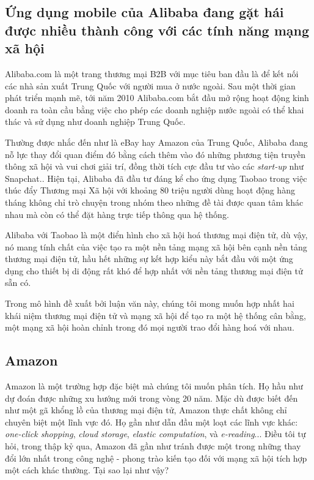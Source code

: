 \subsection{Ứng dụng mobile của Alibaba đang gặt hái được nhiều thành công với các tính năng mạng xã hội}

Alibaba.com là một trang thương mại B2B với mục tiêu ban đầu là để kết nối các nhà sản xuất Trung Quốc với người mua ở nước ngoài. Sau một thời gian phát triển mạnh mẽ, tới năm 2010 Alibaba.com bắt đầu mở rộng hoạt động kinh doanh ra toàn cầu bằng việc cho phép các doanh nghiệp nước ngoài có thể khai thác và sử dụng như doanh nghiệp Trung Quốc.

Thường được nhắc đến như là eBay hay Amazon của Trung Quốc, Alibaba đang nỗ lực thay đổi quan điểm đó bằng cách thêm vào đó những phương tiện truyền thông xã hội và vui chơi giải trí, đồng thời tích cực đầu tư vào các \textit{start-up} như Snapchat.\cite{bloomberg1}. Hiện tại, Alibaba đã đầu tư đáng kể cho ứng dụng Taobao trong việc thúc đẩy Thương mại Xã hội với khoảng 80 triệu người dùng hoạt động hàng tháng không chỉ trò chuyện trong nhóm theo những đề tài được quan tâm khác nhau mà còn có thể đặt hàng trực tiếp thông qua hệ thống.

Alibaba với Taobao là một điển hình cho xã hội hoá thương mại điện tử, dù vậy, nó mang tính chất của việc tạo ra một nền tảng mạng xã hội bên cạnh nền tảng thương mại điện tử, hầu hết những sự kết hợp kiểu này bắt đầu với một ứng dụng cho thiết bị di động rất khó để hợp nhất với nền tảng thương mại điện tử sẵn có.

Trong mô hình đề xuất bởi luận văn này, chúng tôi mong muốn hợp nhất hai khái niệm thương mại điện tử và mạng xã hội để tạo ra một hệ thống cân bằng, một mạng xã hội hoàn chỉnh trong đó mọi người trao đổi hàng hoá với nhau.

\subsection{Amazon}

Amazon là một trường hợp đặc biệt mà chúng tôi muốn phân tích. Họ hầu như dự đoán được những xu hướng mới trong vòng 20 năm. Mặc dù được biết đến như một gã khổng lồ của thương mại điện tử, Amazon thực chất không chỉ chuyên biệt một lĩnh vực đó. Họ gần như dẫn đầu một loạt các lĩnh vực khác: \textit{one-click shopping}, \textit{cloud storage}, \textit{elastic computation}, và \textit{e-reading}... Điều tôi tự hỏi, trong thập kỷ qua, Amazon đã gần như tránh được một trong những thay đổi lớn nhất trong công nghệ - phong trào kiến tạo đối với mạng xã hội tích hợp một cách khác thường. Tại sao lại như vậy?

